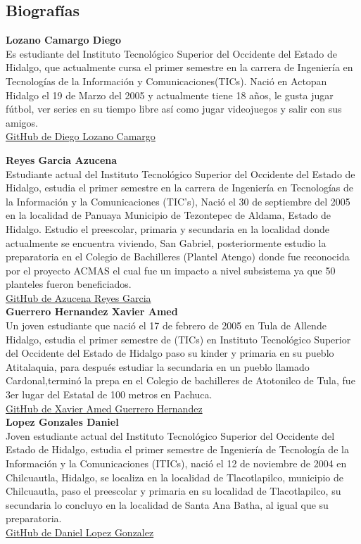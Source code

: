 \documentclass[conference]{IEEEtran}
\begin{document}
\subsection{Biografías}

\textbf{Lozano Camargo Diego} \\
Es estudiante del Instituto Tecnológico Superior del Occidente del Estado de Hidalgo, que actualmente cursa el primer semestre en la carrera de Ingeniería en Tecnologías de la Información y Comunicaciones(TICs). Nació en Actopan Hidalgo el 19 de Marzo del 2005 y actualmente tiene 18 años, le gusta jugar fútbol, ver series en su tiempo libre así como jugar videojuegos y salir con sus amigos. \\
\href{https://github.com/diego2334577}{GitHub de Diego Lozano Camargo}

\textbf{Reyes Garcia Azucena} \\
Estudiante actual del Instituto Tecnológico Superior del Occidente del Estado de Hidalgo, estudia el primer semestre en la carrera de Ingeniería  en Tecnologías de la Información y la Comunicaciones (TIC's), Nació el 30 de septiembre del 2005 en la localidad de Panuaya  Municipio de Tezontepec de Aldama, Estado de Hidalgo. Estudio el preescolar, primaria y secundaria en la localidad donde actualmente se encuentra viviendo, San Gabriel, posteriormente estudio la preparatoria en el Colegio de Bachilleres (Plantel Atengo) donde fue reconocida por el proyecto ACMAS el cual fue un impacto a nivel subsistema ya que 50 planteles fueron beneficiados. \\
\href{https://github.com/AzucenaReyesGarcia}{GitHub de Azucena Reyes Garcia}\\

\textbf{Guerrero Hernandez Xavier Amed} \\
Un joven estudiante que nació el 17 de febrero de 2005 en Tula de Allende Hidalgo, estudia el primer semestre de (TICs) en Instituto Tecnológico Superior del Occidente del Estado de Hidalgo paso su kinder y primaria en su pueblo Atitalaquia, para después estudiar la secundaria en un pueblo llamado Cardonal,terminó la prepa en el Colegio de bachilleres de Atotonilco de Tula, fue 3er lugar del Estatal de 100 metros en Pachuca. \\
\href{https://github.com/XavierGuerreroo}{GitHub de Xavier Amed Guerrero Hernandez} \\

\textbf{Lopez Gonzales Daniel} \\
Joven estudiante actual del Instituto Tecnológico Superior del Occidente del Estado de Hidalgo, estudia el primer semestre de Ingeniería de Tecnología de la Información y la Comunicaciones (ITICs), nació el 12 de noviembre de 2004 en Chilcuautla, Hidalgo, se localiza en la localidad de Tlacotlapilco, municipio de Chilcuautla, paso el preescolar y primaria en su localidad de Tlacotlapilco, su secundaria lo concluyo en la localidad de Santa Ana Batha, al igual que su preparatoria. \\
\href{https://github.com/LopezDanielgod}{GitHub de Daniel Lopez Gonzalez}\\
\end{document}
